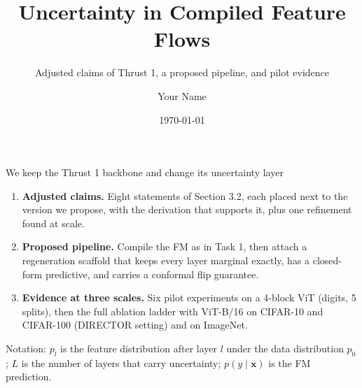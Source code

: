 \documentclass[aspectratio=169,11pt]{beamer}
\title{Uncertainty in Compiled Feature Flows}
\subtitle{Adjusted claims of Thrust 1, a proposed pipeline, and pilot evidence}
\author{Your Name}
\institute{Progress report, meeting with Prof.~Nghia}
\date{\today}
\newcommand{\x}{\bm{x}}
\begin{document}
\maketitle

\begin{frame}{We keep the Thrust 1 backbone and change its uncertainty layer}
  \begin{enumerate}
    \item \textbf{Adjusted claims.} Eight statements of Section 3.2, each placed next to the version we propose, with the derivation that supports it, plus one refinement found at scale.
    \item \textbf{Proposed pipeline.} Compile the FM as in Task 1, then attach a regeneration scaffold that keeps every layer marginal exactly, has a closed-form predictive, and carries a conformal flip guarantee.
    \item \textbf{Evidence at three scales.} Six pilot experiments on a 4-block ViT (digits, 5 splits), then the full ablation ladder with ViT-B/16 on CIFAR-10 and CIFAR-100 (DIRECTOR setting) and on ImageNet.
  \end{enumerate}
  \smallskip
  {\small Notation: $p_l$ is the feature distribution after layer $l$ under the data distribution $p_0$; $L$ is the number of layers that carry uncertainty; $p(y\mid\x)$ is the FM prediction.}
\end{frame}
\end{document}
